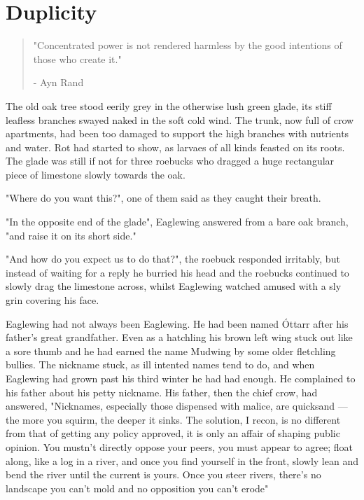 \chapter{Duplicity}

\vspace{-1.3cm}
\begin{localsize}{10}
	\begin{quote}
		"Concentrated power is not rendered harmless by the good intentions of those who create it."
		\begin{flushright}- Ayn Rand \end{flushright}
	\end{quote} 
\end{localsize}
\vspace{1cm}

The old oak tree stood eerily grey in the otherwise lush green glade, its stiff leafless branches swayed naked in the soft cold wind. The trunk, now full of crow apartments, had been too damaged to support the high branches with nutrients and water. Rot had started to show, as larvaes of all kinds feasted on its roots. The glade was still if not for three roebucks who dragged a huge rectangular piece of limestone slowly towards the oak.

"Where do you want this?", one of them said as they caught their breath.

"In the opposite end of the glade", Eaglewing answered from a bare oak branch, "and raise it on its short side."

"And how do you expect us to do that?", the roebuck responded irritably, but instead of waiting for a reply he burried his head and the roebucks continued to slowly drag the limestone across, whilst Eaglewing watched amused with a sly grin covering his face.  
	
Eaglewing had not always been Eaglewing. He had been named Óttarr after his father's great grandfather. Even as a hatchling his brown left wing stuck out like a sore thumb and he had earned the name Mudwing by some older fletchling bullies. The nickname stuck, as ill intented names tend to do, and when Eaglewing had grown past his third winter he had had enough. He  complained to his father about his petty nickname. His father, then the chief crow, had answered, "Nicknames, especially those dispensed with malice, are quicksand — the more you squirm, the deeper it sinks. The solution, I recon, is no different from that of getting any policy approved, it is only an affair of shaping public opinion. You mustn't directly oppose your peers, you must appear to agree; float along, like a log in a river, and once you find yourself in the front, slowly lean and bend the river until the current is yours. Once you steer rivers, there's no landscape you can't mold and no opposition you can't erode"

